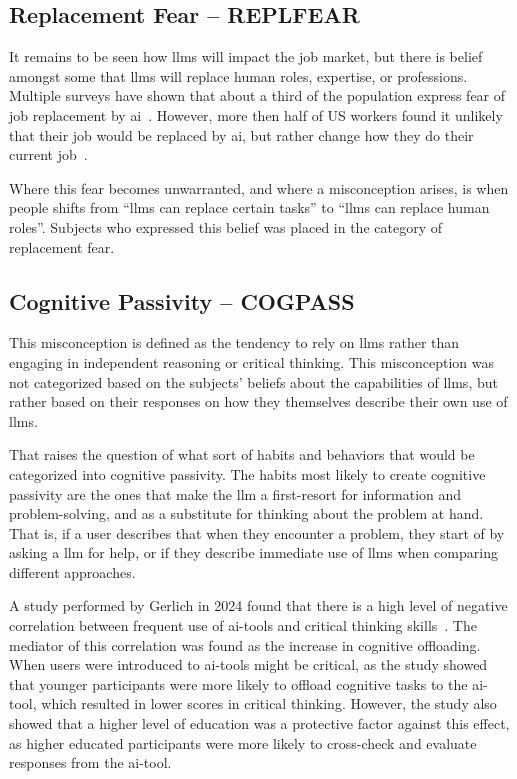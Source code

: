 \subsection{Replacement Fear -- REPLFEAR}\label{replfear}
It remains to be seen how \gls{llms} will impact the job market, but there is belief amongst some that \gls{llms} will replace human roles, expertise, or professions. Multiple surveys have shown that about a third of the population express fear of job replacement by \gls{ai}~\cite{chhibber_will_2025,lin_us_2025}. However, more then half of US workers found it unlikely that their job would be replaced by \gls{ai}, but rather change how they do their current job~\cite{lin_us_2025}.

Where this fear becomes unwarranted, and where a misconception arises, is when people shifts from ``\gls{llms} can replace certain tasks'' to ``\gls{llms} can replace human roles''. Subjects who expressed this belief was placed in the category of replacement fear. 

\subsection{Cognitive Passivity -- COGPASS}\label{cogpass}
This misconception is defined as the tendency to rely on \gls{llms} rather than engaging in independent reasoning or critical thinking. This misconception was not categorized based on the subjects' beliefs about the capabilities of \gls{llms}, but rather based on their responses on how they themselves describe their own use of \gls{llms}. 

That raises the question of what sort of habits and behaviors that would be categorized into cognitive passivity. The habits most likely to create cognitive passivity are the ones that make the \gls{llm} a first-resort for information and problem-solving, and as a substitute for thinking about the problem at hand. That is, if a user describes that when they encounter a problem, they start of by asking a \gls{llm} for help, or if they describe immediate use of \gls{llms} when comparing different approaches.

A study performed by Gerlich in 2024 found that there is a high level of negative correlation between frequent use of \gls{ai}-tools and critical thinking skills~\cite{gerlich_ai_2025}. The mediator of this correlation was found as the increase in cognitive offloading. When users were introduced to \gls{ai}-tools might be critical, as the study showed that younger participants were more likely to offload cognitive tasks to the \gls{ai}-tool, which resulted in lower scores in critical thinking. However, the study also showed that a higher level of education was a protective factor against this effect, as higher educated participants were more likely to cross-check and evaluate responses from the \gls{ai}-tool.

